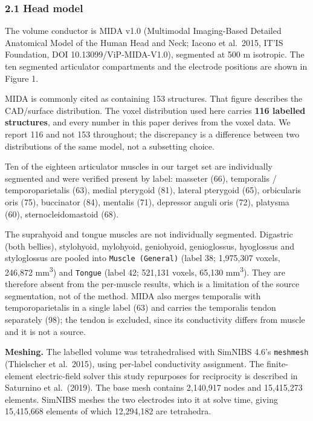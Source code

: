 \documentclass[
  11pt,
  letterpaper,
]{article}
\begin{document}
\subsubsection{2.1 Head model}\label{head-model}

The volume conductor is MIDA v1.0 (Multimodal Imaging-Based Detailed Anatomical
Model of the Human Head and Neck; Iacono et al.~2015, IT'IS Foundation, DOI
10.13099/ViP-MIDA-V1.0), segmented at 500 \textmu{}m isotropic. The ten segmented
articulator compartments and the electrode positions are shown in Figure 1.

MIDA is commonly cited as containing 153 structures. That figure describes the
CAD/surface distribution. The voxel distribution used here carries \textbf{116
labelled structures}, and every number in this paper derives from the voxel
data. We report 116 and not 153 throughout; the discrepancy is a difference
between two distributions of the same model, not a subsetting choice.

Ten of the eighteen articulator muscles in our target set are individually
segmented and were verified present by label: masseter (66), temporalis /
temporoparietalis (63), medial pterygoid (81), lateral pterygoid (65),
orbicularis oris (75), buccinator (84), mentalis (71), depressor anguli oris
(72), platysma (60), sternocleidomastoid (68).

The suprahyoid and tongue muscles are not individually segmented. Digastric
(both bellies), stylohyoid, mylohyoid, geniohyoid, genioglossus, hyoglossus and
styloglossus are pooled into \texttt{Muscle\ (General)} (label 38; 1,975,307 voxels,
246,872 mm\textsuperscript{3}) and \texttt{Tongue} (label 42; 521,131 voxels, 65,130 mm\textsuperscript{3}). They are
therefore absent from the per-muscle results, which is a limitation of the
source segmentation, not of the method. MIDA also merges temporalis with
temporoparietalis in a single label (63) and carries the temporalis tendon
separately (98); the tendon is excluded, since its conductivity differs from
muscle and it is not a source.

\textbf{Meshing.} The labelled volume was tetrahedralised with SimNIBS 4.6's
\texttt{meshmesh} (Thielscher et al.~2015), using per-label conductivity assignment. The
finite-element electric-field solver this study repurposes for reciprocity is
described in Saturnino et al.~(2019). The base mesh contains
2,140,917 nodes and 15,415,273 elements. SimNIBS meshes the two electrodes into
it at solve time, giving 15,415,668 elements of which 12,294,182 are tetrahedra.
\end{document}
